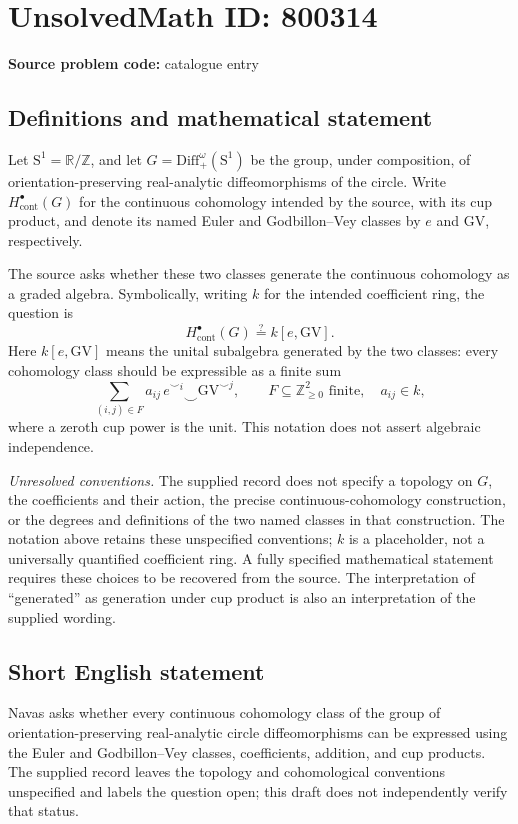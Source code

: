 \documentclass[11pt]{article}
\newcommand{\Z}{\mathbb{Z}}
\newcommand{\R}{\mathbb{R}}
\begin{document}
\section*{UnsolvedMath ID: 800314}
\textbf{Source problem code:} catalogue entry
\subsection{Definitions and mathematical statement}
Let \(\mathrm{S}^1=\R/\Z\), and let \(G=\mathrm{Diff}^{\omega}_+(\mathrm{S}^1)\) be the group, under composition, of orientation-preserving real-analytic diffeomorphisms of the circle. Write \(H^\bullet_{\mathrm{cont}}(G)\) for the continuous cohomology intended by the source, with its cup product, and denote its named Euler and Godbillon--Vey classes by \(e\) and \(\mathrm{GV}\), respectively.

The source asks whether these two classes generate the continuous cohomology as a graded algebra. Symbolically, writing \(k\) for the intended coefficient ring, the question is
\[
H^\bullet_{\mathrm{cont}}(G)\stackrel{?}{=}k[e,\mathrm{GV}].
\]
Here \(k[e,\mathrm{GV}]\) means the unital subalgebra generated by the two classes: every cohomology class should be expressible as a finite sum
\[
\sum_{(i,j)\in F} a_{ij}\,e^{\smile i}\smile\mathrm{GV}^{\smile j},
\qquad F\subseteq\Z_{\geq 0}^2\text{ finite},\quad a_{ij}\in k,
\]
where a zeroth cup power is the unit. This notation does not assert algebraic independence.

\textit{Unresolved conventions.} The supplied record does not specify a topology on \(G\), the coefficients and their action, the precise continuous-cohomology construction, or the degrees and definitions of the two named classes in that construction. The notation above retains these unspecified conventions; \(k\) is a placeholder, not a universally quantified coefficient ring. A fully specified mathematical statement requires these choices to be recovered from the source. The interpretation of ``generated'' as generation under cup product is also an interpretation of the supplied wording.
\subsection{Short English statement}
Navas asks whether every continuous cohomology class of the group of orientation-preserving real-analytic circle diffeomorphisms can be expressed using the Euler and Godbillon--Vey classes, coefficients, addition, and cup products. The supplied record leaves the topology and cohomological conventions unspecified and labels the question open; this draft does not independently verify that status.
\end{document}
